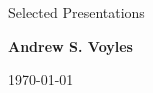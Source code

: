 \documentclass{resume2} %
\begin{document}

\begin{center}
{\Large Selected Presentations}

{\large \textbf{Andrew S. Voyles}}

\today
\end{center} 

\end{document}
